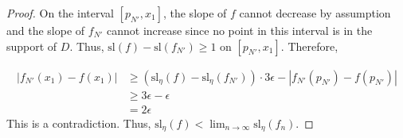 \documentclass[10pt,a4paper]{amsart}
\begin{document}
\begin{proof}
		On the interval $[p_{N'}, x_1]$, the slope of $f$ cannot decrease by assumption and the slope of $f_{N'}$ cannot increase since no point in this interval is in the support of $D$. Thus, $\mathrm{sl}(f) - \mathrm{sl}(f_{N'}) \geq 1$ on $[p_{N'},x_1]$. Therefore,
		
		\begin{align*}
			|f_{N'}(x_1) - f(x_1)| & \geq (\mathrm{sl}_{\eta}(f) - \mathrm{sl}_{\eta}(f_{N'})) \cdot 3 \epsilon - |f_{N'}(p_{N'}) - f(p_{N'})| \\
			& \geq 3 \epsilon - \epsilon \\
			& = 2 \epsilon
		\end{align*}
		This is a contradiction. Thus, $\displaystyle \mathrm{sl}_{\eta}(f) < \lim_{n \to \infty} \mathrm{sl}_{\eta}(f_n)$.
	\end{proof}
\end{document}
